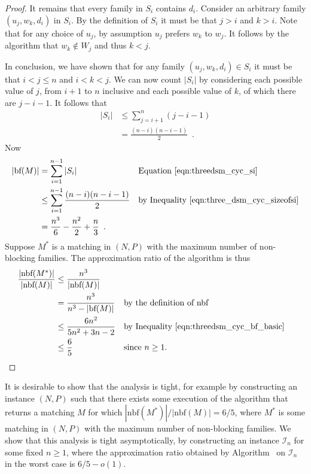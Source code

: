 \begin{proof}
It remains that every family in $S_i$ contains $d_i$. Consider an arbitrary family $( u_j, w_k, d_i )$ in $S_i$. By the definition of $S_i$ it must be that $j > i$ and $k > i$. Note that for any choice of $u_j$, by assumption $u_j$ prefers $w_k$ to $w_j$. It follows by the algorithm that $w_k \notin W_j$ and thus $k < j$. 

In conclusion, we have shown that for any family $( u_j, w_k, d_i ) \in S_i$ it must be that $i < j \leq n$ and $i < k < j$. We can now count $|S_i|$ by considering each possible value of $j$, from $i+1$ to $n$ inclusive and each possible value of $k$, of which there are $j - i - 1$. It follows that
\begin{align}
    |S_i| &\leq \sum\limits_{j=i+1}^{n} (j - i - 1)\nonumber\\
    &= \frac{(n-i)(n-i-1)}{2} \label{eqn:three_dsm_cyc_sizeofsi}\enspace.
\end{align}
Now
\begin{align}
    |\text{bf}(M)| &= \sum\limits_{i=1}^{n-1} |S_i| && \mbox{Equation~\ref{eqn:threedsm_cyc_si}}\nonumber\\
    &\leq \sum\limits_{i=1}^{n-1} \frac{(n - i)(n - i - 1)}{2} && \mbox{by Inequality~\ref{eqn:three_dsm_cyc_sizeofsi}}\nonumber\\
    &= \frac{n^3}{6} - \frac{n^2}{2} + \frac{n}{3}\label{eqn:threedsm_cyc_bf_basic}\enspace.
\end{align}
Suppose $M^*$ is a matching in $(N, P)$ with the maximum number of non-blocking families. The approximation ratio of the algorithm is thus
\begin{align*}
    \frac{|\textrm{nbf}(M^*)|}{|\textrm{nbf}(M)|} &\leq \frac{n^3}{|\textrm{nbf}(M)|}\\
    &= \frac{n^3}{n^3 - |\textrm{bf}(M)|} && \mbox{by the definition of $\textrm{nbf}$}\\
    &\leq \frac{6n^2}{5n^2 + 3n - 2} && \mbox{by Inequality~\ref{eqn:threedsm_cyc_bf_basic}}\\
    &\leq \frac{6}{5} && \mbox{since $n \geq 1$.} 
\end{align*}
\end{proof}
It is desirable to show that the analysis is tight, for example by constructing an instance $(N, P)$ such that there exists some execution of the algorithm that returns a matching $M$ for which $|\textrm{nbf}(M^*)|/|\textrm{nbf}(M)| = 6/5$, where $M^*$ is some matching in $(N, P)$ with the maximum number of non-blocking families. We show that this analysis is tight asymptotically, by constructing an instance $\mathcal{I}_n$ for some fixed $n \geq 1$, where the approximation ratio obtained by Algorithm~ on $\mathcal{I}_n$ in the worst case is $6/5 - o(1)$.

